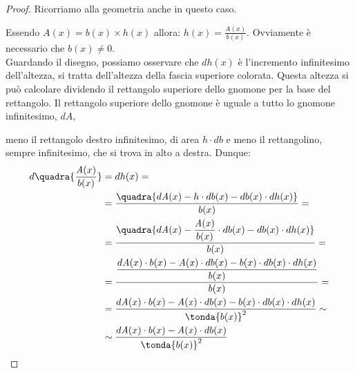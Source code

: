 \begin{proof}
Ricorriamo alla geometria anche in questo caso.


 \begin{minipage}[]{.38 \textwidth}
Essendo $\mathit{A}(x)=b(x) \times h(x)$ allora: 
$h(x)=\frac{A(x)}{b(x)}$. 
Ovviamente è necessario che $b(x)\neq 0$.\\
Guardando il disegno, possiamo osservare che $dh(x)$ è l'incremento 
infinitesimo dell'altezza, si tratta dell'altezza della fascia superiore 
colorata.
Questa altezza si può calcolare dividendo il rettangolo 
superiore dello gnomone per la base del rettangolo.
Il rettangolo superiore dello gnomone è uguale a tutto lo gnomone 
infinitesimo, $d\mathit{A}$,
 \end{minipage} 
 \hfill
 \begin{minipage}[]{.58 \textwidth}
 \begin{center}
 \begin{inaccessibleblock}
  \differenzialerapporto
 \end{inaccessibleblock}
 \end{center}
 \end{minipage}
meno il rettangolo destro infinitesimo, di 
area $h\cdot db$ e meno il rettangolino, sempre infinitesimo, che si trova 
in alto a destra.
Dunque:
\begin{align}
 d\quadra{\frac{\mathit{A}(x)}{b(x)}}&=dh(x)=\\
 &=\frac{\quadra{d\mathit{A}(x) - h \cdot db(x) - db(x) \cdot dh(x)}}
        {b(x)}=\\
 &=\frac{\quadra{d\mathit{A}(x) - \dfrac{\mathit{A(x)}}{b(x)} \cdot db(x) - 
          db(x) \cdot dh(x)}}{b(x)}=\\
 &=\frac{\dfrac{d\mathit{A}(x) \cdot b(x) - \mathit{A(x)} \cdot db(x) -
               b(x) \cdot db(x) \cdot dh(x)}
              {b(x)}}
        {b(x)}=\\
 &=\frac{d\mathit{A}(x) \cdot b(x) - \mathit{A(x)} \cdot db(x) -
              b(x) \cdot db(x) \cdot dh(x)}
        {\tonda{b(x)}^2} \sim \\
 & \sim \frac{d\mathit{A}(x) \cdot b(x) - \mathit{A(x)} \cdot db(x)}
             {\tonda{b(x)}^2}
\end{align}
\end{proof}


